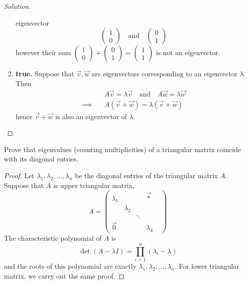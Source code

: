 \begin{proof}[Solution]
\begin{enumerate}[label={(\alph*)}]
      eigenvector 
      \[
        \begin{pmatrix} 1\\0 \end{pmatrix}
        \quad\text{and}\quad
        \begin{pmatrix} 0\\1 \end{pmatrix}
      \]
      however their sum 
      $
        \begin{pmatrix} 1\\0 \end{pmatrix}+
        \begin{pmatrix} 0\\1 \end{pmatrix}=
        \begin{pmatrix} 1\\1 \end{pmatrix}
      $
      is not an eigenvector.
    \item \textbf{true.} Suppose that $\vec{v},\vec{w}$ are eigenvectors 
      corresponding to an eigenvector $\lambda$. Then
      \begin{align*}
        &A\vec{v}=\lambda\vec{v}
        \quad\text{and}\quad 
        A\vec{w}=\lambda\vec{w}\\\implies\quad
        &A(\vec{v}+\vec{w})=\lambda(\vec{v}+\vec{w})
      \end{align*}
      hence $\vec{v}+\vec{w}$ is also an eigenvector of $\lambda$.
  \end{enumerate}
\end{proof}
\setcounter{exercise}{4}
\begin{exercise}
  Prove that eigenvalues (counting multiplicities) of a
  triangular matrix coincide with its diagonal entries.
\end{exercise}
\begin{proof}
  Let $\lambda_1,\lambda_2,\dots,\lambda_n$ be the diagonal entries of 
  the triangular matrix $A$. Suppose that $A$ is upper triangular 
  matrix,
  \[
    A=
    \begin{pmatrix}
      \lambda_1 & & & \vec{*}\\
                & \lambda_2 & & &\\
                & & \ddots  & & \\
      \vec{0}   & & &  \lambda_4
    \end{pmatrix}
  \]
  The characteristic polynomial of $A$ is
  \[
    \det(A-\lambda I)=\prod_{i=1}^{n}(\lambda_i-\lambda)
  \]
  and the roots of this polynomial are exactly 
  $\lambda_1,\lambda_2,\dots,\lambda_n$. For lower triangular 
  matrix, we carry out the same proof.
\end{proof}
